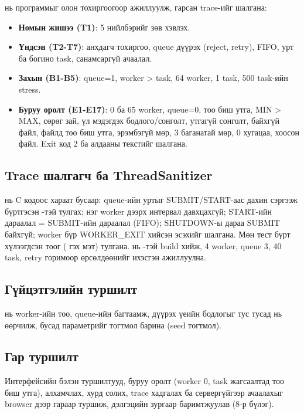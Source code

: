 \documentclass[12pt,a4paper]{article}
\begin{document}
 нь программыг олон тохиргоогоор ажиллуулж, гарсан trace-ийг шалгана:

\begin{itemize}
  \item \textbf{Номын жишээ (T1)}:  5 нийлбэрийг зөв хэвлэх.
  \item \textbf{Үндсэн (T2-T7)}: анхдагч тохиргоо, queue дүүрэх (reject, retry), FIFO, урт ба богино task, санамсаргүй ачаалал.
  \item \textbf{Захын (B1-B5)}: queue=1, worker > task, 64 worker, 1 task, 500 task-ийн stress.
  \item \textbf{Буруу оролт (E1-E17)}: 0 ба 65 worker, queue=0, тоо биш утга, MIN > MAX, сөрөг зай, үл мэдэгдэх бодлого/сонголт, утгагүй сонголт, байхгүй файл, файлд тоо биш утга, эрэмбэгүй мөр, 3 баганатай мөр, 0 хугацаа, хоосон файл. Exit код 2 ба алдааны текстийг шалгана.
\end{itemize}

\subsection{Trace шалгагч ба ThreadSanitizer}

 нь C кодоос хараат бусаар: queue-ийн уртыг SUBMIT/START-аас дахин сэргээж бүртгэсэн -тэй тулгах; нэг worker дээрх интервал давхцахгүй; START-ийн дараалал = SUBMIT-ийн дараалал (FIFO); SHUTDOWN-ы дараа SUBMIT байхгүй; worker бүр WORKER\_EXIT хийсэн эсэхийг шалгана. Мөн тест бүрт хүлээгдсэн тоог ( гэх мэт) тулгана.  нь -тэй build хийж, 4 worker, queue 3, 40 task, retry горимоор өрсөлдөөнийг ихэсгэн ажиллуулна.

\subsection{Гүйцэтгэлийн туршилт}

 нь worker-ийн тоо, queue-ийн багтаамж, дүүрэх үеийн бодлогыг тус тусад нь өөрчилж, бусад параметрийг тогтмол барина (seed тогтмол).

\subsection{Гар туршилт}

Интерфейсийн бэлэн туршилтууд, буруу оролт (worker 0, task жагсаалтад тоо биш утга), алхамчлах, хурд солих, trace хадгалах ба сервергүйгээр ачаалахыг browser дээр гараар туршиж, дэлгэцийн зургаар баримтжуулав (8-р бүлэг).
\end{document}
